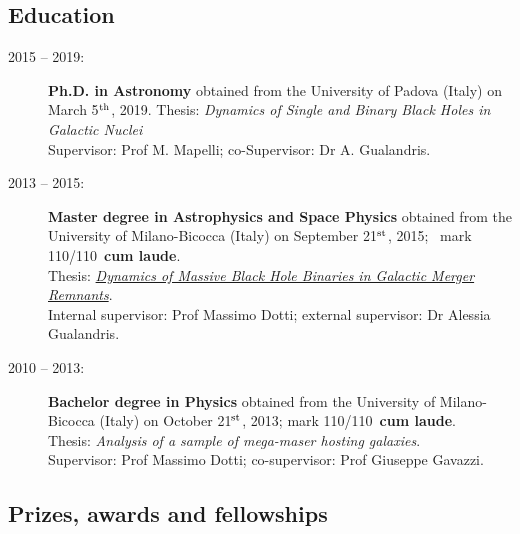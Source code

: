 \documentclass[11pt,a4paper]{article}
\begin{document}
\subsection*{Education}
\begin{description}
    \item[2015 – 2019:] {\bf Ph.D. in Astronomy} obtained from the University of Padova (Italy) on March 5$^{\rm th}$, 2019. 
    Thesis: \textit{Dynamics of Single and Binary Black Holes in Galactic Nuclei}\\
    Supervisor: Prof M. Mapelli; co-Supervisor: Dr A. Gualandris. 
    
    \item[2013 – 2015:] {\bf Master degree in Astrophysics and Space Physics} obtained from the University of Milano-Bicocca (Italy) on September 21$^{\rm st}$, 2015; \ mark 110/110~{\bf cum laude}. \\
    Thesis: \textit{ \href{https://drive.google.com/file/d/0Bx7KflRPRjKbZTRkc19yeXdLc1E/view?usp=sharing}{Dynamics of Massive Black Hole Binaries in Galactic Merger Remnants}}.\\
    Internal supervisor: Prof Massimo Dotti; external supervisor: Dr Alessia Gualandris.
    
    \item[2010 – 2013:] {\bf Bachelor degree in Physics} obtained from the University of Milano-Bicocca (Italy) on October 21$^{\rm st}$, 2013; mark 110/110~{\bf cum laude}.\\
    Thesis: \textit{Analysis of a sample of mega-maser hosting galaxies}.\\ Supervisor: Prof Massimo Dotti; co-supervisor: Prof Giuseppe Gavazzi.

\end{description}

\subsection*{Prizes, awards and fellowships}
\end{document}
